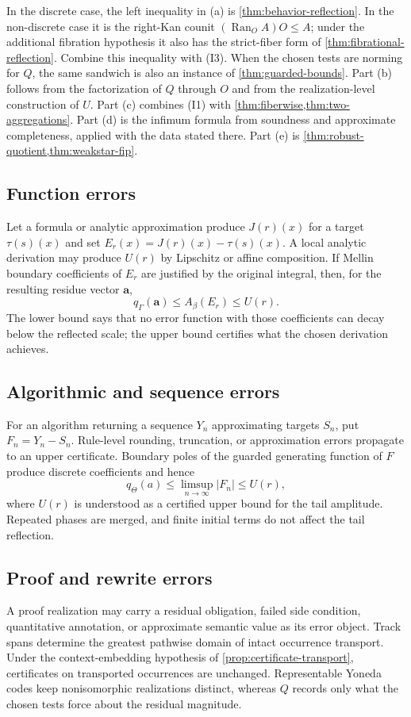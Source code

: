 \documentclass[12pt,a4paper,twoside]{extarticle}
\makeatletter
\theoremstyle{compactplain}
\theoremstyle{compactdef}
\renewenvironment{proof}[1][\proofname]{\par\pushQED{\qed}\normalfont
  \topsep2pt\trivlist\item[\hskip\labelsep\bfseries #1\@addpunct{.}]\ignorespaces}
 {\popQED\endtrivlist\@endpefalse}
\newcommand{\Ran}{\operatorname{Ran}}
\makeatother
\begin{document}
\begin{proof}
In the discrete case, the left inequality in (a) is \cref{thm:behavior-reflection}.  In the non-discrete case it is the right-Kan counit $(\Ran_OA)O\le A$; under the additional fibration hypothesis it also has the strict-fiber form of \cref{thm:fibrational-reflection}.  Combine this inequality with (I3).  When the chosen tests are norming for $Q$, the same sandwich is also an instance of \cref{thm:guarded-bounds}.  Part (b) follows from the factorization of $Q$ through $O$ and from the realization-level construction of $U$.  Part (c) combines (I1) with \cref{thm:fiberwise,thm:two-aggregations}.  Part (d) is the infimum formula from soundness and approximate completeness, applied with the data stated there.  Part (e) is \cref{thm:robust-quotient,thm:weakstar-fip}.
\end{proof}

\subsection{Function errors}
Let a formula or analytic approximation produce $J(r)(x)$ for a target $\tau(s)(x)$ and set $E_r(x)=J(r)(x)-\tau(s)(x)$.  A local analytic derivation may produce $U(r)$ by Lipschitz or affine composition.  If Mellin boundary coefficients of $E_r$ are justified by the original integral, then, for the resulting residue vector $\mathbf a$,
\[
 q_\Gamma(\mathbf a)\le A_\beta(E_r)\le U(r).
\]
The lower bound says that no error function with those coefficients can decay below the reflected scale; the upper bound certifies what the chosen derivation achieves.

\subsection{Algorithmic and sequence errors}
For an algorithm returning a sequence $Y_n$ approximating targets $S_n$, put $F_n=Y_n-S_n$.  Rule-level rounding, truncation, or approximation errors propagate to an upper certificate.  Boundary poles of the guarded generating function of $F$ produce discrete coefficients and hence
\[
 q_\Theta(a)\le\limsup_{n\to\infty}|F_n|\le U(r),
\]
where $U(r)$ is understood as a certified upper bound for the tail amplitude.  Repeated phases are merged, and finite initial terms do not affect the tail reflection.

\subsection{Proof and rewrite errors}
A proof realization may carry a residual obligation, failed side condition, quantitative annotation, or approximate semantic value as its error object.  Track spans determine the greatest pathwise domain of intact occurrence transport.  Under the context-embedding hypothesis of \cref{prop:certificate-transport}, certificates on transported occurrences are unchanged.  Representable Yoneda codes keep nonisomorphic realizations distinct, whereas $Q$ records only what the chosen tests force about the residual magnitude.
\end{document}
